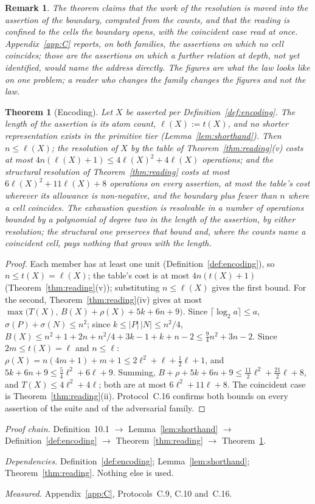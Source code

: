 \documentclass[pdflatex,sn-mathphys-num]{sn-jnl}
\theoremstyle{thmstyleone}%
\newtheorem{theorem}{Theorem}[section]
\theoremstyle{thmstyletwo}%
\newtheorem{remark}{Remark}[section]
\theoremstyle{thmstylethree}%
\newtheorem{theorem}{Theorem}[section]
\newtheorem{remark}{Remark}[section]
\newcommand{\deps}[1]{\par\begin{sloppypar}\noindent\emph{Dependencies.} #1 Nothing else is used.\end{sloppypar}}
\newcommand{\chain}[1]{\par\begin{sloppypar}\noindent\emph{Proof chain.} #1\end{sloppypar}}
\newcommand{\measured}[1]{\par\begin{sloppypar}\noindent\emph{Measured.} #1\end{sloppypar}}
\begin{document}
\begin{remark}
The theorem claims that the work of the resolution is moved into the assertion of the boundary, computed from the counts, and that the reading is confined to the cells the boundary opens, with the coincident case read at once. Appendix~\ref{app:C} reports, on both families, the assertions on which no cell coincides; those are the assertions on which a further relation at depth, not yet identified, would name the address directly. The figures are what the law looks like on one problem; a reader who changes the family changes the figures and not the law.
\end{remark}

\begin{theorem}[Encoding]\label{thm:encoding}
Let $X$ be asserted per Definition~\ref{def:encoding}. The length of the assertion is its atom count, $\ell(X):=t(X)$, and no shorter representation exists in the primitive tier (Lemma~\ref{lem:shorthand}). Then $n\le\ell(X)$; the resolution of $X$ by the table of Theorem~\ref{thm:reading}(v) costs at most $4n(\ell(X)+1)\le4\ell(X)^2+4\ell(X)$ operations; and the structural resolution of Theorem~\ref{thm:reading} costs at most $6\ell(X)^2+11\ell(X)+8$ operations on every assertion, at most the table's cost wherever its allowance is non-negative, and the boundary plus fewer than $n$ where a cell coincides. The exhaustion question is resolvable in a number of operations bounded by a polynomial of degree two in the length of the assertion, by either resolution; the structural one preserves that bound and, where the counts name a coincident cell, pays nothing that grows with the length.
\end{theorem}
\begin{proof}
Each member has at least one unit (Definition~\ref{def:encoding}), so $n\le t(X)=\ell(X)$; the table's cost is at most $4n(t(X)+1)$ (Theorem~\ref{thm:reading}(v)); substituting $n\le\ell(X)$ gives the first bound. For the second, Theorem~\ref{thm:reading}(iv) gives at most $\max\bigl(T(X),\,B(X)+\rho(X)+5k+6n+9\bigr)$. Since $\lceil\log_2 a\rceil\le a$, $\sigma(P)+\sigma(N)\le n^2$; since $k\le|P|\,|N|\le n^2/4$, $B(X)\le n^2+1+2n+n^2/4+3k-1+k+n-2\le\tfrac94n^2+3n-2$. Since $2m\le t(X)=\ell$ and $n\le\ell$: $\rho(X)=n(4m+1)+m+1\le2\ell^2+\ell+\tfrac12\ell+1$, and $5k+6n+9\le\tfrac54\ell^2+6\ell+9$. Summing, $B+\rho+5k+6n+9\le\tfrac{11}{2}\ell^2+\tfrac{21}{2}\ell+8$, and $T(X)\le4\ell^2+4\ell$; both are at most $6\ell^2+11\ell+8$. The coincident case is Theorem~\ref{thm:reading}(ii). Protocol~C.16 confirms both bounds on every assertion of the suite and of the adversarial family.
\end{proof}
\chain{Definition~10.1 $\to$ Lemma~\ref{lem:shorthand} $\to$ Definition~\ref{def:encoding} $\to$ Theorem~\ref{thm:reading} $\to$ Theorem~\ref{thm:encoding}.}
\deps{Definition~\ref{def:encoding}; Lemma~\ref{lem:shorthand}; Theorem~\ref{thm:reading}.}
\measured{Appendix~\ref{app:C}, Protocols~C.9, C.10 and~C.16.}
\end{document}
